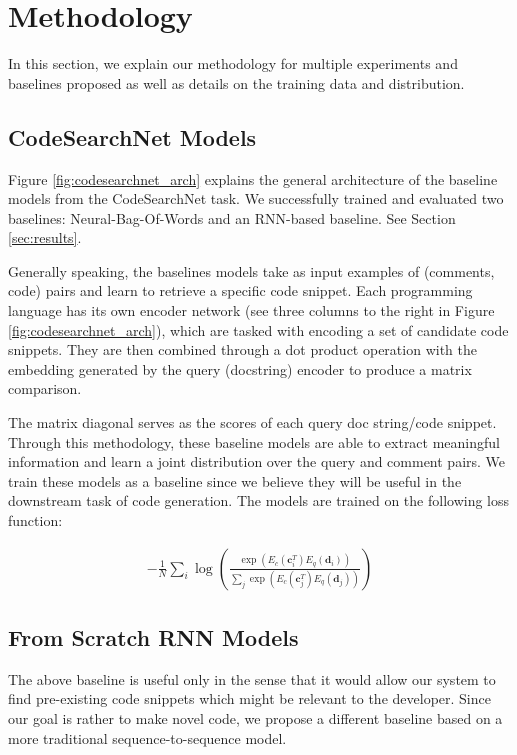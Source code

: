 \documentclass[10pt,twocolumn]{article}
\begin{document}
\section{Methodology}
In this section, we explain our methodology for multiple experiments and baselines proposed as well as details on the training data and distribution.

\subsection{CodeSearchNet Models}
Figure \ref{fig:codesearchnet_arch} explains the general architecture of the baseline models from the CodeSearchNet task. We successfully trained and evaluated two baselines: Neural-Bag-Of-Words and an RNN-based baseline. See Section \ref{sec:results}.

Generally speaking, the baselines models take as input examples of (comments, code) pairs and learn to retrieve a specific code snippet. Each programming language has its own encoder network (see three columns to the right in Figure \ref{fig:codesearchnet_arch}), which are tasked with encoding a set of candidate code snippets. They are then combined through a dot product operation with the embedding generated by the query (docstring) encoder to produce a matrix comparison. 

The matrix diagonal serves as the scores of each query doc string/code snippet. Through this methodology, these baseline models are able to extract meaningful information and learn a joint distribution over the query and comment pairs. We train these models as a baseline since we believe they will be useful in the downstream task of code generation. The models are trained on the following loss function:

\begin{align}
    -\frac{1}{N}\sum_i \log \left( \frac{\exp(E_c(\textbf{c}_i^T)E_q(\textbf{d}_i))}{\sum_{j} \exp(E_c(\textbf{c}_j^T)E_q(\textbf{d}_j))}  \right)
    \label{eq:code_search_net_loss}
\end{align}

\subsection{From Scratch RNN Models}
The above baseline is useful only in the sense that it would allow our system to find pre-existing code snippets which might be relevant to the developer. Since our goal is rather to make novel code, we propose a different baseline based on a more traditional sequence-to-sequence model.
\end{document}
